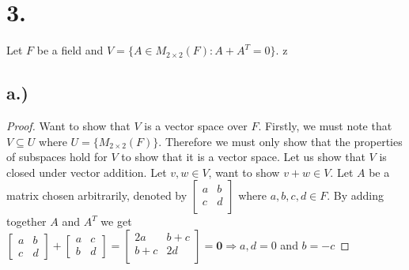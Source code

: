 \documentclass{article}
\begin{document}
\section*{3.}
Let $F$ be a field and $V = \{A \in M_{2 \times 2} (F) : A + A^T = 0\}$.
z
\subsection*{a.)}
\begin{proof}
Want to show that $V$ is a vector space over $F$. Firstly, we must note that $V \subseteq U$ where $U = \{ M_{2 \times 2} (F) \}$. Therefore we must only show that the properties of subspaces hold for $V$ to show that it is a vector space. Let us show that $V$ is closed under vector addition. Let $v,w \in V$, want to show $v + w \in V$. Let $A$ be a matrix chosen arbitrarily, denoted by
$\begin{bmatrix}
a &b \\
c &d \\
\end{bmatrix}$
where $a, b, c, d \in F$. By adding together $A$ and $A^T$ we get \\
$
\begin{bmatrix} a &b \\c &d \end{bmatrix}  +
\begin{bmatrix} a &c \\ b &d \end{bmatrix}  =
\begin{bmatrix} 2a &b+c \\ b+c &2d \\ \end{bmatrix} = \mathbf{0}
\Rightarrow a, d = 0$ and $b = -c$


\end{proof}
\end{document}
